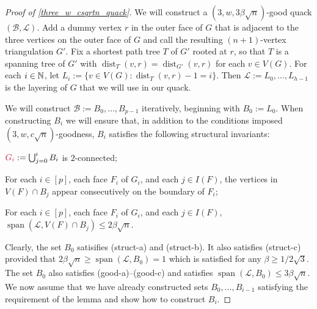 \documentclass{patmorin}
\makeatletter
\def\mathcolor#1#{\@mathcolor{#1}}
\def\@mathcolor#1#2#3{%
  \protect\leavevmode
  \begingroup
    \color#1{#2}#3%
  \endgroup
}
\newcommand{\mathdefin}[1]{\mathcolor{brightmaroon}{#1}}
\DeclareMathOperator{\spn}{span}
\DeclareMathOperator{\dist}{dist}
\makeatother
\begin{document}
\begin{proof}[Proof of \cref{three_w_csqrtn_quack}]
  We will construct a  $(3,w,3\beta\sqrt{n})$-good quack $(\mathcal{B},\mathcal{L})$.
  Add a dummy vertex $r$ in the outer face of $G$ that is adjacent to the three vertices on the outer face of $G$ and call the resulting $(n+1)$-vertex triangulation $G'$.  Fix a shortest path tree $T$ of $G'$ rooted at $r$, so that $T$ is a spanning tree of $G'$ with $\dist_T(v,r)=\dist_{G'}(v,r)$ for each $v\in V(G)$.  For each $i\in\mathbb{N}$, let $L_i:=\{v\in V(G):\dist_T(v,r)-1=i\}$.  Then $\mathcal{L}:=L_0,\ldots,L_{h-1}$ is the layering of $G$ that we will use in our quack.

  We will construct $\mathcal{B}:=B_0,\ldots,B_{p-1}$ iteratively, beginning with $B_0:=L_0$.  When constructing $B_i$ we will ensure that, in addition to the conditions imposed $(3,w,c\sqrt{n})$-goodness, $B_i$ satisfies the following structural invariants:
  \begin{compactenum}[({struct}-a)]
    \item $\mathdefin{G_i}:=\bigcup_{j=0}^i B_i$ is $2$-connected;
    \item For each $i\in[p]$, each face $F_i$ of $G_i$, and each $j\in I(F)$,  the vertices in $V(F)\cap B_j$ appear consecutively on the boundary of $F_i$;
    \item For each $i\in[p]$, each face $F_i$ of $G_i$, and each $j\in I(F)$, $\spn(\mathcal{L},V(F)\cap B_j)\le 2\beta\sqrt{n}$.
  \end{compactenum}

  Clearly, the set $B_0$ satisifies (struct-a) and (struct-b). It also satisfies (struct-c) provided that $2\beta\sqrt{n} \ge \spn(\mathcal{L},B_0)=1$ which is satisfied for any $\beta\ge 1/2\sqrt{3}$.  The set $B_0$ also satisfies (good-a)--(good-c) and satisfies $\spn(\mathcal{L},B_0)\le 3\beta\sqrt{n}$.  We now assume that we have already constructed sets $B_0,\ldots,B_{i-1}$ satisfying the requirement of the lemma and show how to construct $B_i$.


\end{proof}
\end{document}
